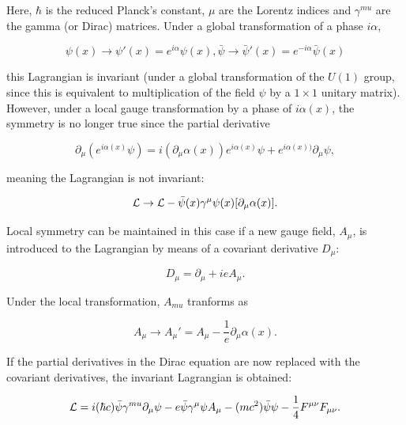 Here, $\hbar$ is the reduced Planck's constant, $\mu$ are the Lorentz indices and $\gamma^{mu}$ are the gamma
(or Dirac) matrices. Under a global transformation of a phase $i \alpha$, 

\begin{equation}
\psi(x) \rightarrow \psi'(x) = e^{i\alpha}\psi(x), \bar{\psi} \rightarrow \bar{\psi}'(x) =
e^{-i\alpha}\bar{\psi}(x)
\end{equation}

this Lagrangian is invariant (\ie under a global transformation of the $U(1)$ group, since this is
equivalent to multiplication of the field $\psi$ by a $1 \times 1$ unitary matrix). However, under a local
gauge transformation by a phase of $i\alpha(x)$, the symmetry is no longer true since the partial derivative

\begin{equation}
\partial_{\mu}(e^{i\alpha(x)}\psi) = i(\partial_{\mu}\alpha(x))e^{i\alpha(x)}\psi +
e^{i\alpha(x))}\partial_{\mu}\psi ,
\end{equation}

meaning the Lagrangian is not invariant:

\begin{equation}
\mathcal{L} \rightarrow \mathcal{L} - \bar{\psi}(x)\gamma^{\mu}\psi(x)[\partial_{\mu}\alpha(x)].
\end{equation}

Local symmetry can be maintained in this case if a new gauge field, $A_\mu$, is introduced to the Lagrangian
by means of a covariant derivative $D_\mu$:

\begin{equation}
D_{\mu} = \partial_{\mu} + ieA_{\mu}.
\end{equation}

Under the local transformation, $A_{mu}$ tranforms as

\begin{equation}
A_{\mu} \rightarrow A_{\mu}' = A_{\mu} - \frac{1}{e}\partial_{\mu}\alpha(x).
\end{equation}

If the partial derivatives in the Dirac equation are now replaced with the covariant derivatives, the
invariant Lagrangian is obtained:

\begin{equation}
\mathcal{L} = i (\hbar c) \bar{\psi} \gamma^{mu} \partial_{\mu} \psi - e \bar{\psi} \gamma^{\mu} \psi A_{\mu} -
(mc^{2}) \bar{\psi} \psi - \frac{1}{4}F^{\mu\nu}F_{\mu\nu}.
\end{equation}

